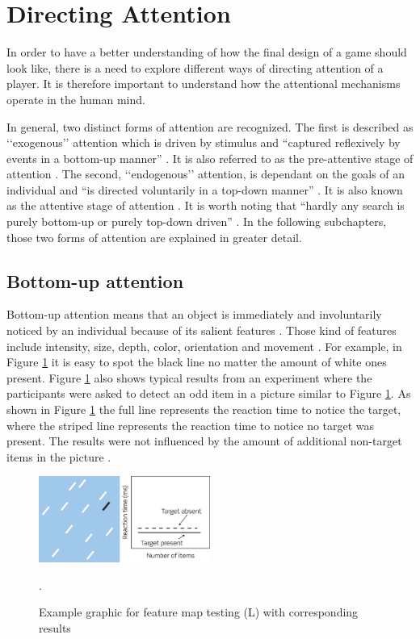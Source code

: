 \section{Directing Attention}\label{sec:direct_attention}
In order to have a better understanding of how the final design of a game should look like, there is a need to explore different ways of directing attention of a player. It is therefore important to understand how the attentional mechanisms operate in the human mind.


In general, two distinct forms of attention are recognized. The first is described as ‘‘exogenous’’ attention which is driven by stimulus and “captured reflexively by events in a bottom-up manner” \cite{lee2011efficient}. It is also referred to as the pre-attentive stage of attention \cite{zhai2008scalable}. The second, ‘‘endogenous’’ attention, is dependant on the goals of an individual and “is directed voluntarily in a top-down manner” \cite{lee2011efficient}. It is also known as the attentive stage of attention \cite{zhai2008scalable}. It is worth noting that “hardly any search is purely bottom-up or purely top-down driven” \cite{melloni2012interaction}. In the following subchapters, those two forms of attention are explained in greater detail.

\subsection{Bottom-up attention}\label{subsec:buttonup attention}
Bottom-up attention means that an object is immediately and involuntarily noticed by an individual because of its salient features \cite{melloni2012interaction}. Those kind of features include intensity, size, depth, color, orientation and movement \cite{zhai2008scalable}. For example, in Figure \ref{fig:visual_search_paradign_i} it is easy to spot the black line no matter the amount of white ones present. Figure \ref{fig:visual_search_paradign_i} also shows typical results from an experiment where the participants were asked to detect an odd item in a picture similar to Figure \ref{fig:visual_search_paradign_i}. As shown in Figure \ref{fig:visual_search_paradign_i} the full line represents the reaction time to notice the target, where the striped line represents the reaction time to notice no target was present. The results were not influenced by the amount of additional non-target items in the picture \cite{snowden2012basic}.

\begin{figure}[h!]
	\centering
	\includegraphics[width=0.5\textwidth]{figures/Visual_search_paradigm_I.jpg}
	\caption{Example graphic for feature map testing (L) with corresponding results \cite{snowden2012basic}}.\label{fig:visual_search_paradign_i}
\end{figure}

